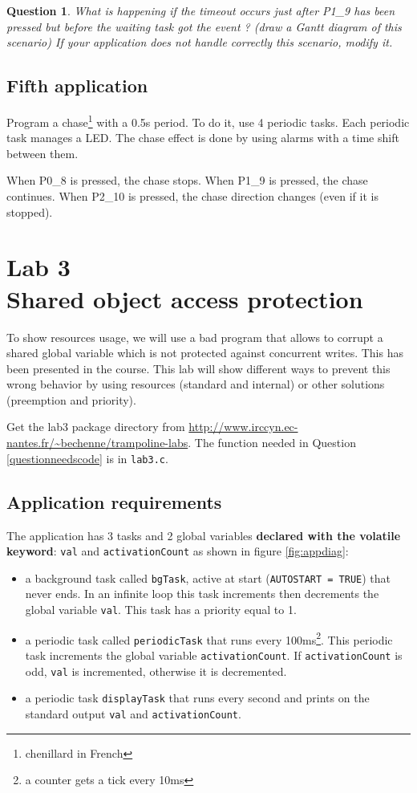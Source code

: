 \documentclass[11pt]{report}
\newtheorem{ex}{Question}
\begin{document}
\begin{ex}
What is happening if the timeout occurs just after P1_9 has been pressed but before the waiting task got the event ? (draw a Gantt diagram of this scenario) If your application does not handle correctly this scenario, modify it.
\end{ex}

\section{Fifth application}

Program a chase\footnote{chenillard in French} with a 0.5s period. To do it, use 4 periodic tasks. Each periodic task manages a LED. The chase effect is done by using alarms with a time shift between them.

When P0_8 is pressed, the chase stops. When P1_9 is pressed, the chase continues. When P2_10 is pressed, the chase direction changes (even if it is stopped).

\chapter{Lab 3\\Shared object access protection} 

To show resources usage, we will use a bad program that allows to corrupt a shared global variable which is not protected against concurrent writes. This has been presented in the course. This lab will show different ways to prevent this wrong behavior by using resources (standard and internal) or other solutions (preemption and priority).

Get the lab3 package directory from \url{http://www.irccyn.ec-nantes.fr/~bechenne/trampoline-labs}. The function needed in Question \ref{questionneedscode} is in \texttt{lab3.c}.

\section{Application requirements}
The application has 3 tasks and 2 global variables {\bf declared with the volatile keyword}: \texttt{val} and \texttt{activationCount} as shown in figure \ref{fig:appdiag}:

\begin{itemize}
\item a background task called \texttt{bgTask}, active at start (\texttt{AUTOSTART = TRUE}) that never ends. In an infinite loop this task increments then decrements the global variable \texttt{val}. This task has a priority equal to 1.
\item a periodic task called \texttt{periodicTask} that runs every 100ms\footnote{a counter gets a tick every 10ms}. This periodic task increments the global variable \texttt{activationCount}. If \texttt{activationCount} is odd, \texttt{val} is incremented, otherwise it is decremented.
\item a periodic task \texttt{displayTask} that runs every second and prints on the standard output \texttt{val} and \texttt{activationCount}.
\end{itemize}
\end{document}
